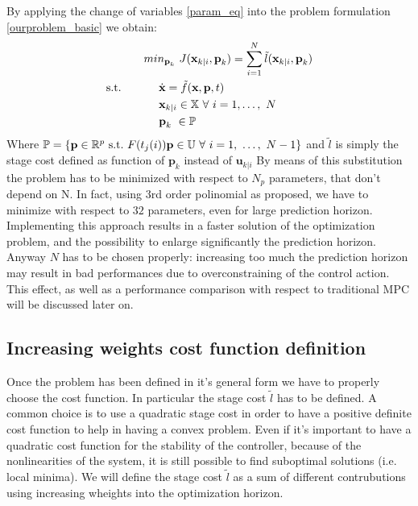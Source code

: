 By applying the change of variables \ref{param_eq} into the problem formulation \ref{ourproblem_basic} we obtain:
\begin{equation} \label{ourproblem_param}
\begin{split}
		& min_{\textbf{p}_k}\ J(\textbf{x}_{k|i},\textbf{p}_k) = \sum_{i=1}^{N}\tilde{l}(\textbf{x}_{k|i},\textbf{p}_k) \\
		\textnormal{s.t.}\qquad
		&\ \ \ \ \dot{\textbf{x}}=\tilde{f}(\textbf{x},\textbf{p},t) \\
		&\ \ \ \ \textbf{x}_{k|i} \in \mathbb{X}\ \forall\ i=1,\dots,\ N  \\
		&\ \ \ \ \textbf{p}_k\   \in \mathbb{P}\ \\
	\end{split}	
\end{equation}
Where $\mathbb{P} = \lbrace \textbf{p}\in \mathbb{R}^p\ \textnormal{s.t.}\ F(t_j(i))\textbf{p} \in \mathbb{U}\ \forall\ i = 1,\ \dots,\ N-1 \rbrace $ and $\tilde{l}$ is simply the stage cost defined as function of $\textbf{p}_k$ instead of $\textbf{u}_{k|i}$ By means of this substitution the problem has to be minimized with respect to $N_p$ parameters, that don't depend on N. In fact, using 3rd order polinomial as proposed, we have to minimize with respect to $32$ parameters, even for large prediction horizon. Implementing this approach results in a faster solution of the optimization problem, and the possibility to enlarge significantly the prediction horizon. Anyway $N$ has to be chosen properly: increasing too much the prediction horizon may result in bad performances due to overconstraining of the control action. This effect, as well as a performance comparison with respect to traditional MPC will be discussed later on.

\subsection{Increasing weights cost function definition}

Once the problem has been defined in it's general form we have to properly choose the cost function. In particular the stage cost $\tilde{l}$ has to be defined. A common choice is to use a quadratic stage cost in order to have a positive definite cost function to help in having a convex problem. Even if it's important to have a quadratic cost function for the stability of the controller, because of the nonlinearities of the system, it is still possible to find suboptimal solutions (i.e. local minima). We will define the stage cost $\tilde{l}$ as a sum of different contrubutions using increasing wheights into the optimization horizon. 

